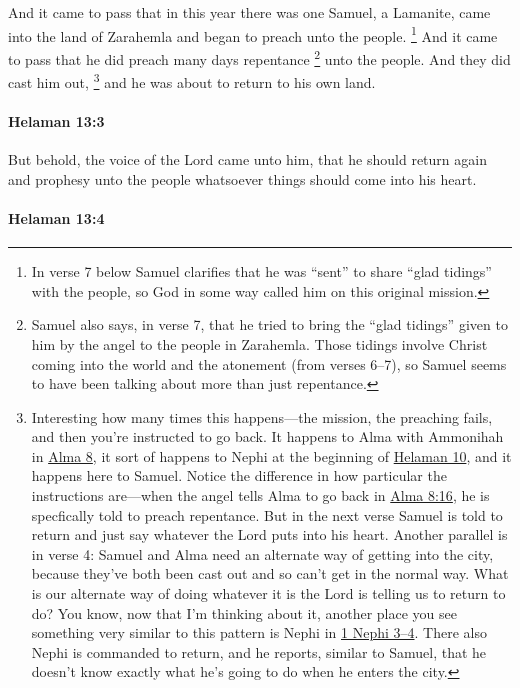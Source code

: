 			And it came to pass that in this year
			there was one Samuel, a Lamanite, came into the land of Zarahemla
			and began to preach unto the people.%
				\footnote{%
					In verse 7 below Samuel clarifies that he was ``sent'' to share ``glad tidings'' with the people, so God in some way called him on this original mission.
					}
			And it came to pass that he did preach many days repentance%
				\footnote{%
					Samuel also says, in verse 7, that he tried to bring the ``glad tidings'' given to him by the angel to the people in Zarahemla. Those tidings involve Christ coming into the world and the atonement (from verses 6--7), so Samuel seems to have been talking about more than just repentance.
					}
			unto the people.
			And they did cast him out,
				\footnote{%
					Interesting how many times this happens---the mission, the preaching fails, and then you're instructed to go back. It happens to Alma with Ammonihah in \hyperref[ALMA-8]{Alma 8}, it sort of happens to Nephi at the beginning of \hyperref[HELAMAN-10]{Helaman 10}, and it happens here to Samuel. Notice the difference in how particular the instructions are---when the angel tells Alma to go back in \hyperref[ALMA-8-16]{Alma 8:16}, he is specfically told to preach repentance. But in the next verse Samuel is told to return and just say whatever the Lord puts into his heart. Another parallel is in verse 4: Samuel and Alma need an alternate way of getting into the city, because they've both been cast out and so can't get in the normal way. What is our alternate way of doing whatever it is the Lord is telling us to return to do? You know, now that I'm thinking about it, another place you see something very similar to this pattern is Nephi in \hyperref[1NEPHI-3]{1 Nephi 3--4}. There also Nephi is commanded to return, and he reports, similar to Samuel, that he doesn't know exactly what he's going to do when he enters the city.
					}%
			and he was about to return to his own land.

		\paragraph{Helaman 13:3} %
			\label{HELAMAN-13-3}

			But behold, the voice of the Lord came unto him,
			that he should return again
			and prophesy unto the people
			whatsoever things should come into his heart.

		\paragraph{Helaman 13:4} %
			\label{HELAMAN-13-4}

